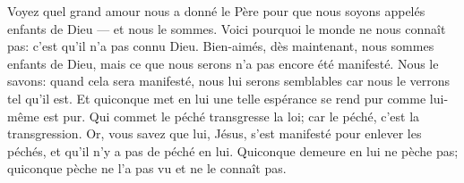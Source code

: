 Voyez quel grand amour nous a donné le Père pour que nous soyons appelés enfants de Dieu
	--- et nous le sommes.
Voici pourquoi le monde ne nous connaît pas:
	c’est qu’il n’a pas connu Dieu.
Bien-aimés, dès maintenant, nous sommes enfants de Dieu,
	mais ce que nous serons n’a pas encore été manifesté.
Nous le savons: quand cela sera manifesté, nous lui serons semblables
	car nous le verrons tel qu’il est.
Et quiconque met en lui une telle espérance se rend pur comme lui-même est pur.
Qui commet le péché transgresse la loi;
	car le péché, c’est la transgression.
Or, vous savez que lui, Jésus, s’est manifesté pour enlever les péchés,
	et qu’il n’y a pas de péché en lui.
Quiconque demeure en lui ne pèche pas;
	quiconque pèche ne l’a pas vu et ne le connaît pas.

